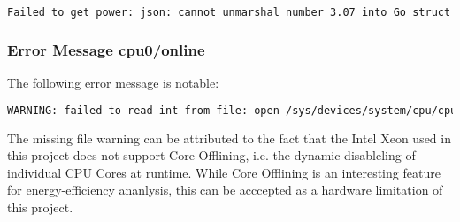 \begin{lstlisting}[language=bash]
Failed to get power: json: cannot unmarshal number 3.07 into Go struct field Voltages.Voltages.ReadingVolts of type int
\end{lstlisting}

\subsubsection{Error Message cpu0/online}
The following error message is notable: 
\begin{lstlisting}[language=bash]
WARNING: failed to read int from file: open /sys/devices/system/cpu/cpu0/online: no such file or directory
\end{lstlisting}
The missing file warning can be attributed to the fact that the Intel Xeon used in this project does not support Core Offlining, i.e. the dynamic disableling of individual CPU Cores at runtime. While Core Offlining is an interesting feature for energy-efficiency ananlysis, this can be acccepted as a hardware limitation of this project.